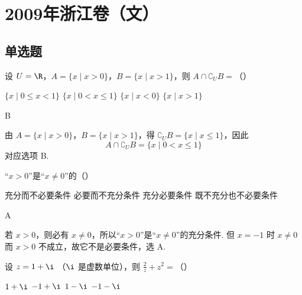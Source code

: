 
\chapter{2009年浙江卷（文）}

\section{单选题}

\begin{problem}
设 \(U = \R\)，\(A = \{x \mid x > 0\}\)，\(B = \{x \mid x > 1\}\)，则 \(A \cap \complement_U B =\)（\quad）

\choices
    {\(\{x\mid 0\leqslant x < 1\}\)}
    {\(\{x\mid 0 < x\leqslant 1\}\)}
    {\( \{x \mid x < 0\} \)}
    {\( \{x \mid x > 1\} \)}
\end{problem}

\begin{answer}
B
\end{answer}

\begin{solution}
由 \(A=\{x\mid x>0\}\)，\(B=\{x\mid x>1\}\)，得
\(\complement_U B=\{x\mid x\leqslant 1\}\)，因此
\[
A\cap\complement_U B=\{x\mid 0<x\leqslant 1\}
\]
对应选项 B.
\end{solution}

\begin{problem}
“\(x > 0\)”是“\(x \ne 0\)”的（\quad）

\choices
    {充分而不必要条件}
    {必要而不充分条件}
    {充分必要条件}
    {既不充分也不必要条件}
\end{problem}

\begin{answer}
A
\end{answer}

\begin{solution}
若 \(x>0\)，则必有 \(x\neq0\)，所以“\(x>0\)”是“\(x\neq0\)”的充分条件.
但 \(x=-1\) 时 \(x\neq0\) 而 \(x>0\) 不成立，故它不是必要条件，选 A.
\end{solution}

\begin{problem}
设 \(z = 1 + \i\) （\(\i\) 是虚数单位），则 \(\frac{2}{z} + z^2 =\)（\quad）

\choices
    {\(1 + \i\)}
    {\(-1 + \i\)}
    {\(1 - \i\)}
    {\(-1 - \i\)}
\end{problem}

